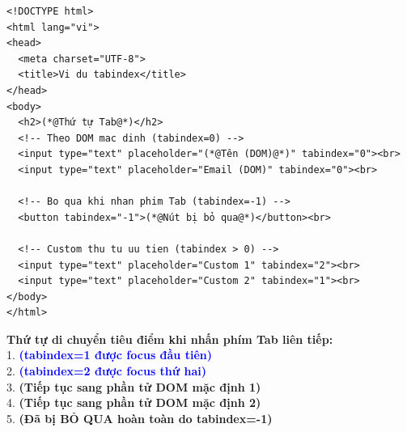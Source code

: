 \begin{codeWindow}
\begin{lstlisting}[language=HTML5]
<!DOCTYPE html>
<html lang="vi">
<head>
  <meta charset="UTF-8">
  <title>Vi du tabindex</title>
</head>
<body>
  <h2>(*@Thứ tự Tab@*)</h2>
  <!-- Theo DOM mac dinh (tabindex=0) -->
  <input type="text" placeholder="(*@Tên (DOM)@*)" tabindex="0"><br>
  <input type="text" placeholder="Email (DOM)" tabindex="0"><br>
  
  <!-- Bo qua khi nhan phim Tab (tabindex=-1) -->
  <button tabindex="-1">(*@Nút bị bỏ qua@*)</button><br>
  
  <!-- Custom thu tu uu tien (tabindex > 0) -->
  <input type="text" placeholder="Custom 1" tabindex="2"><br>
  <input type="text" placeholder="Custom 2" tabindex="1"><br>
</body>
</html>
\end{lstlisting}
\end{codeWindow}

\begin{browserWindow}
\sffamily\small
\textbf{Thứ tự di chuyển tiêu điểm khi nhấn phím Tab liên tiếp:}\\[4pt]
1.  \quad \textcolor{blue}{\bfseries (tabindex=1 được focus đầu tiên)}\\[4pt]
2.  \quad \textcolor{blue}{\bfseries (tabindex=2 được focus thứ hai)}\\[4pt]
3.  \quad \textcolor{primaryBlue}{\bfseries (Tiếp tục sang phần tử DOM mặc định 1)}\\[4pt]
4.  \quad \textcolor{primaryBlue}{\bfseries (Tiếp tục sang phần tử DOM mặc định 2)}\\[4pt]
5.  \quad \textcolor{red!70!black}{\bfseries (Đã bị BỎ QUA hoàn toàn do tabindex=-1)}
\end{browserWindow}

